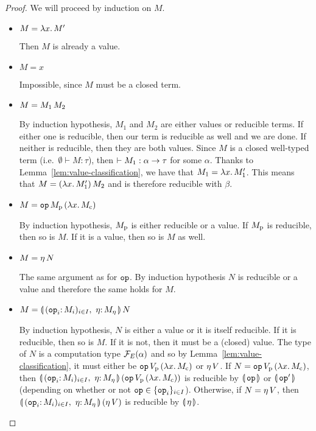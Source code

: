 \begin{proof}
  We will proceed by induction on $M$.

  \begin{itemize}
  \item $M = \lambda x.\, M'$

    Then $M$ is already a value.

  \item $M = x$

    Impossible, since $M$ must be a closed term.

  \item $M = M_1\,M_2$

    By induction hypothesis, $M_1$ and $M_2$ are either values or reducible
    terms. If either one is reducible, then our term is reducible as well
    and we are done. If neither is reducible, then they are both
    values. Since $M$ is a closed well-typed term (i.e.\
    $\emptyset \vdash M : \tau$), then
    $\empty \vdash M_1 : \alpha \to \tau$ for some $\alpha$. Thanks to
    Lemma~\ref{lem:value-classification}, we have that
    $M_1 = \lambda x.\, M_1'$. This means that $M = (\lambda x.\, M_1')\,M_2$
    and is therefore reducible with $\beta$.

  \item $M = \mathtt{op}\,M_{\mathrm{p}}\,(\lambda x.\, M_{\mathrm{c}})$

    By induction hypothesis, $M_{\mathrm{p}}$ is either reducible or a value. If
    $M_{\mathrm{p}}$ is reducible, then so is $M$. If it is a value, then so is
    $M$ as well.

  \item $M = \eta\,N$

    The same argument as for $\mathtt{op}$. By induction hypothesis $N$ is
    reducible or a value and therefore the same holds for $M$.

  \item $M = \ap{\cibanana}{N}$

    By induction hypothesis, $N$ is either a value or it is itself
    reducible. If it is reducible, then so is $M$. If it is not, then it
    must be a (closed) value. The type of $N$ is a computation type
    $\mathcal{F}_E(\alpha)$ and so by Lemma~\ref{lem:value-classification}, it must
    either be $\mathtt{op}\,V_{\mathrm{p}}\,(\lambda x.\, M_{\mathrm{c}})$ or
    $\eta\,V$. If $N = \mathtt{op}\,V_{\mathrm{p}}\,(\lambda x.\, M_{\mathrm{c}})$,
    then $\ap{\cibanana}{(\app{\op{op}}{V_\petitp}{(\lam{x}{M_\petitc})})}$
    is reducible by $\llparenthesis \, \mathtt{op} \, \rrparenthesis$ or $\llparenthesis \, \mathtt{op}' \, \rrparenthesis$ (depending on
    whether or not $\mathtt{op} \in \{\mathtt{op}_i\}_{i \in I}$). Otherwise, if
    $N = \eta\,V$, then $\ap{\cibanana}{(\etaE{V})}$ is reducible by
    $\llparenthesis \, \eta \, \rrparenthesis$.


\end{itemize}
\end{proof}
